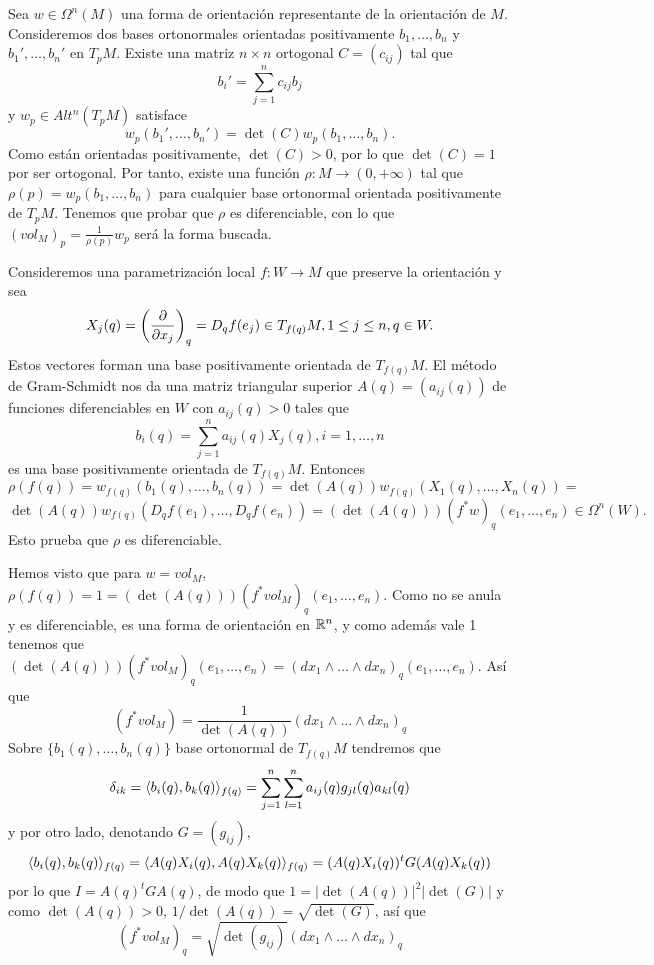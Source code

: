 \documentclass[CV.tex]{subfiles}
\begin{document}
\begin{dem}
Sea $w\in \Omega^n(M)$ una forma de orientación representante de la orientación de $M$. Consideremos dos bases ortonormales orientadas positivamente $b_1,\dots,b_n$ y $b_1',\dots,b_n'$ en $T_pM$. Existe una matriz $n\times n$ ortogonal $C=(c_{ij})$ tal que
\[
b_i'=\sum_{j=1}^n c_{ij}b_j
\]
y $w_p\in Alt^n(T_pM)$ satisface
\[
w_p(b_1',\dots,b_n')=\det(C)w_p(b_1,\dots,b_n).
\]
Como están orientadas positivamente, $\det(C)>0$, por lo que $\det(C)=1$ por ser ortogonal. Por tanto, existe una función $\rho:M\to (0,+\infty)$ tal que $\rho(p)=w_p(b_1,\dots,b_n)$ para cualquier base ortonormal orientada positivamente de $T_pM$. Tenemos que probar que $\rho$ es diferenciable, con lo que $(vol_M)_p=\frac{1}{\rho(p)}w_p$ será la forma buscada. 

Consideremos una parametrización local $f:W\to M$ que preserve la orientación y sea
\[
X_j(q)=\left(\frac{\partial }{\partial x_j}\right)_q=D_qf(e_j)\in T_{f(q)}M, 1\leq j\leq n, q\in W.
\]
Estos vectores forman una base positivamente orientada de $T_{f(q)}M$.
 El método de Gram-Schmidt nos da una matriz triangular superior $A(q)=(a_{ij}(q))$ de funciones diferenciables en $W$ con $a_{ij}(q)>0$ tales que
\[
b_i(q)=\sum_{j=1}^na_{ij}(q)X_j(q), i=1,\dots, n
\]
es una base positivamente orientada de $T_{f(q)}M$. Entonces
\[
\rho( f(q))=w_{f(q)}(b_1(q),\dots, b_n(q))=\det(A(q))w_{f(q)}(X_1(q),\dots, X_n(q))=
\]
\[
\det(A(q))w_{f(q)}(D_qf(e_1), \dots, D_qf(e_n))=(\det(A(q)))(f^*w)_q(e_1,\dots, e_n)\in\Omega^n(W).
\]
Esto prueba que $\rho$ es diferenciable. 
\QED
\end{dem}

Hemos visto que para $w=vol_M$, $\rho(f(q))=1=(\det(A(q)))(f^*vol_M)_q(e_1,\dots, e_n)$. Como no se anula y es diferenciable, es una forma de orientación en $\mathbb{R}^n$, y como además vale 1 tenemos que $(\det(A(q)))(f^*vol_M)_q(e_1,\dots, e_n)=(dx_1\land\dots\land dx_n)_q(e_1,\dots, e_n)$. Así que
\[
(f^*vol_M)=\frac{1}{\det(A(q))}(dx_1\land\dots\land dx_n)_q
\] 
Sobre $\{b_1(q), \dots, b_n(q)\}$ base ortonormal de $T_{f(q)}M$ tendremos que
\[
\delta_{ik}=\langle{b_i(q),b_k(q)}\rangle_{f(q)}=\sum_{j=1}^n\sum_{l=1}^n a_{ij}(q)g_{jl}(q)a_{kl}(q)
\]
y por otro lado, denotando $G=(g_{ij})$,
\[
\langle{b_i(q),b_k(q)}\rangle_{f(q)}=\langle{A(q)X_i(q),A(q)X_k(q)}\rangle_{f(q)}=(A(q)X_i(q))^t G (A(q)X_k(q))
\]
por lo que $I=A(q)^tGA(q)$, de modo que $1=|\det(A(q))|^2|\det(G)|$ y como $\det(A(q))>0$, $1/\det(A(q))=\sqrt{\det(G)}$, así que 
\[
(f^*vol_M)_q=\sqrt{\det(g_{ij})}(dx_1\land\dots\land dx_n)_q
\]
\end{document}
